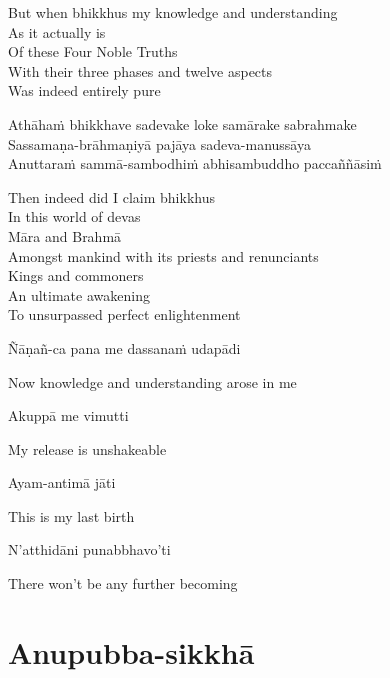 \begin{cprenglish}
  But when bhikkhus my knowledge and understanding\\
  As it actually is\\
  Of these Four Noble Truths\\
  With their three phases and twelve aspects\\
  Was indeed entirely pure
\end{cprenglish}

Athāhaṁ bhikkhave sadevake loke samārake sabrahmake\\
Sassamaṇa-brāhmaṇiyā pajāya sadeva-manussāya\\
Anuttaraṁ sammā-sambodhiṁ abhisambuddho paccaññāsiṁ

\begin{cprenglish}
  Then indeed did I claim bhikkhus\\
  In this world of devas\\
  Māra and Brahmā\\
  Amongst mankind with its priests and renunciants\\
  Kings and commoners\\
  An ultimate awakening\\
  To unsurpassed perfect enlightenment
\end{cprenglish}

Ñāṇañ-ca pana me dassanaṁ udapādi

\begin{cprenglish}
  Now knowledge and understanding arose in me
\end{cprenglish}

Akuppā me vimutti

\begin{cprenglish}
  My release is unshakeable
\end{cprenglish}

Ayam-antimā jāti

\begin{cprenglish}
  This is my last birth
\end{cprenglish}

N’atthidāni punabbhavo’ti

\begin{cprenglish}
  There won’t be any further becoming
\end{cprenglish}

\suttaRef{[SN 56.11]}

\section{Anupubba-sikkhā}

